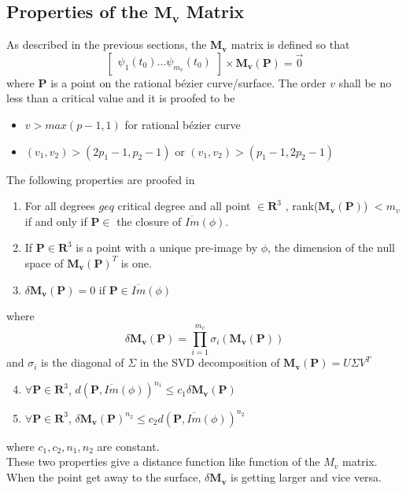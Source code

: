\subsection{Properties of the $\mathbf{M_v}$ Matrix}
As described in the previous sections, the $\mathbf{M_v}$ matrix is defined so that
\begin{equation}
	\begin{bmatrix}
	\psi_1(t_0) \dots \psi_{m_v}(t_0)
	\end{bmatrix}
	\times
	\mathbf{M_v(\mathbf{P})}
	= \vec{0}
\end{equation}
where $\mathbf{P}$ is a point on the rational bézier curve/surface.
The order $v$ shall be no less than a critical value and it is proofed to be
\begin{itemize}
	\item $v>max(p-1,1)$ for rational bézier curve
	\item $(v_1,v_2) > (2p_1 -1, p_2 -1)$ or  $(v_1,v_2) > (p_1 -1, 2p_2 -1)$
\end{itemize}
The following properties are proofed in \cite{Laurent2014}
\begin{enumerate}
	\item For all degrees $geq$ critical degree and all point $\in\mathbf{R}^3$ , rank($\mathbf{M_v}(\mathbf{P})$) $<m_v$ if and only if $\mathbf{P}\in$ the closure of $\overline{Im}(\phi)$.
	\item If $\mathbf{P}\in\mathbf{R}^3$ is a point with a unique pre-image by $\phi$, the dimension of the null space of $\mathbf{M_v}(\mathbf{P})^T$ is one. 
	\item $\delta\mathbf{M_v}(\mathbf{P}) = 0$ if $\mathbf{P} \in\overline{Im}(\phi)$
\end{enumerate}
where 
\begin{equation}
	\delta\mathbf{M_v}(\mathbf{P}) = \prod_{i=1}^{m_v}\sigma_i(\mathbf{M_v}(\mathbf{P}))
\end{equation}
and $\sigma_i$ is the diagonal of $\Sigma$ in the SVD decomposition of $\mathbf{M_v}(\mathbf{P})=U\Sigma V^T$

\begin{enumerate}
	\setcounter{enumi}{3}
	\item $\forall\mathbf{P}\in\mathbf{R}^3$, $d(\mathbf{P},\overline{Im}(\phi))^{n_1}\leq c_1 \delta\mathbf{M_v}(\mathbf{P})$
	\item $\forall\mathbf{P}\in\mathbf{R}^3$, $\delta\mathbf{M_v}(\mathbf{P})^{n_2}\leq c_2 d(\mathbf{P},\overline{Im}(\phi))^{n_2} $
\end{enumerate}
where $c_1,c_2,n_1,n_2$ are constant.\\
These two properties give a distance function like function of the $M_v$ matrix. When the point get away to the surface, $\delta\mathbf{M_v}$ is getting larger and vice versa.
